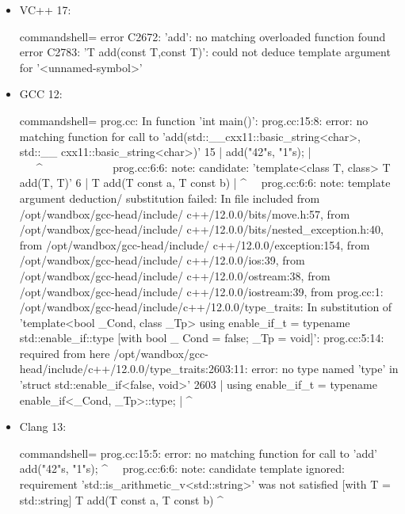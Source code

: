 \begin{itemize}
\item
VC++ 17:

\begin{tcblisting}{commandshell={}}
error C2672: 'add': no matching overloaded function found
error C2783: 'T add(const T,const T)': could not deduce
template argument for '<unnamed-symbol>'
\end{tcblisting}

\item
GCC 12:
\begin{tcblisting}{commandshell={}}
prog.cc: In function 'int main()':
prog.cc:15:8: error: no matching function for call
to 'add(std::__cxx11::basic_string<char>, std::__
cxx11::basic_string<char>)'
15 |         add("42"s, "1"s);
   |       ~~~^~~~~~~~~~~~~
prog.cc:6:6: note: candidate: 'template<class T, class> T
add(T, T)'
6 | T add(T const a, T const b)
  |     ^~~
prog.cc:6:6: note: template argument deduction/
substitution failed:
In file included from /opt/wandbox/gcc-head/include/
c++/12.0.0/bits/move.h:57,
                 from /opt/wandbox/gcc-head/include/
c++/12.0.0/bits/nested_exception.h:40,
                 from /opt/wandbox/gcc-head/include/
c++/12.0.0/exception:154,
                 from /opt/wandbox/gcc-head/include/
c++/12.0.0/ios:39,
                 from /opt/wandbox/gcc-head/include/
c++/12.0.0/ostream:38,
                 from /opt/wandbox/gcc-head/include/
c++/12.0.0/iostream:39,
                 from prog.cc:1:
/opt/wandbox/gcc-head/include/c++/12.0.0/type_traits: In
substitution of 'template<bool _Cond, class _Tp> using
enable_if_t = typename std::enable_if::type [with bool _
Cond = false; _Tp = void]':
prog.cc:5:14: required from here
/opt/wandbox/gcc-head/include/c++/12.0.0/type_traits:2603:11:
error: no type named 'type' in 'struct std::enable_if<false, 
void>'
2603 | using enable_if_t = typename enable_if<_Cond, _Tp>::type;
     |            ^~~~~~~~~~~
\end{tcblisting}

\item
Clang 13:
\begin{tcblisting}{commandshell={}}
prog.cc:15:5: error: no matching function for call to
'add'
    add("42"s, "1"s);
    ^~~
prog.cc:6:6: note: candidate template ignored:
requirement 'std::is_arithmetic_v<std::string>' was not
satisfied [with T = std::string]
   T add(T const a, T const b)
      ^
\end{tcblisting}
\end{itemize}

